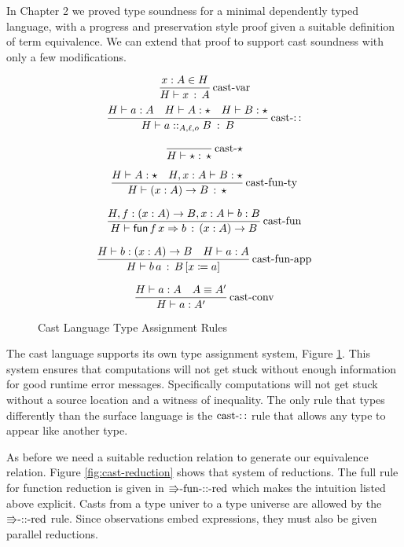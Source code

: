 In Chapter 2 we proved type soundness for a minimal dependently typed
language, with a progress and preservation style proof given a suitable
definition of term equivalence. We can extend that proof to support
cast soundness with only a few modifications.

\begin{figure}
\[
\frac{x:A\in H}{H\vdash x\,:\,A}\operatorname{cast-var}
\]
\[
\frac{H\vdash a:A\quad H\vdash A:\star\quad H\vdash B:\star}{H\vdash a::_{A,\ell,o}B\::\:B}\operatorname{cast-::}
\]

\[
\frac{\,}{H\vdash\star:\,\star}\operatorname{cast-\star}
\]

\[
\frac{H\vdash A:\star\quad H,x:A\vdash B:\star}{H\vdash\left(x:A\right)\rightarrow B\,:\,\star}\operatorname{cast-fun-ty}
\]

\[
\frac{H,f:\left(x:A\right)\rightarrow B,x:A\vdash b:B}{H\vdash\mathsf{fun}\,f\,x\Rightarrow b\,:\,\left(x:A\right)\rightarrow B}\operatorname{cast-fun}
\]

\[
\frac{H\vdash b:\left(x:A\right)\rightarrow B\quad H\vdash a:A}{H\vdash b\,a\,:\,B\left[x\coloneqq a\right]}\operatorname{cast-fun-app}
\]

\[
\frac{H\vdash a:A\quad A\equiv A'}{H\vdash a:A'}\operatorname{cast-conv}
\]


\caption{Cast Language Type Assignment Rules}
\label{fig:cast-tas-rules}
\end{figure}

The cast language supports its own type assignment system, Figure
\ref{fig:cast-tas-rules}. This system ensures that computations will
not get stuck without enough information for good runtime error messages.
Specifically computations will not get stuck without a source location
and a witness of inequality. The only rule that types differently
than the surface language is the $\operatorname{cast-::}$ rule that
allows any type to appear like another type. 

As before we need a suitable reduction relation to generate our equivalence
relation. Figure \ref{fig:cast-reduction} shows that system of reductions.
The full rule for function reduction is given in $\textrm{\ensuremath{\Rrightarrow}-fun-::-red}$
which makes the intuition listed above explicit. Casts from a type
univer to a type universe are allowed by the $\textrm{\ensuremath{\Rrightarrow}-::-red}$
rule. Since observations embed expressions, they must also be given
parallel reductions.


